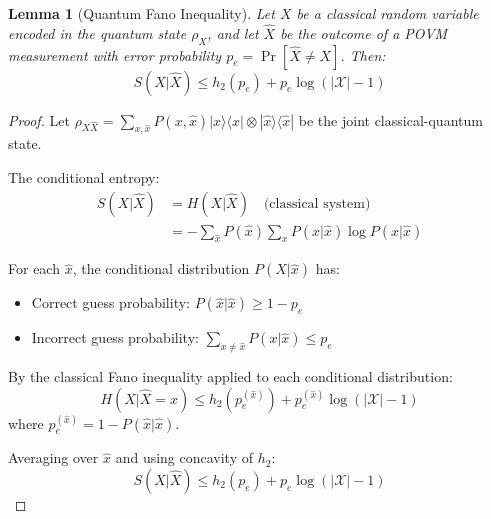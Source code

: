 \documentclass{ieeeaccess}
\newtheorem{lemma}{Lemma}[section]
\begin{document}
\begin{lemma}[Quantum Fano Inequality]\label{lem:quantum_fano}
Let $X$ be a classical random variable encoded in the quantum state $\rho_X$, and let $\hat{X}$ be the outcome of a POVM measurement with error probability $p_e = \Pr[\hat{X} \neq X]$. Then:
\begin{equation}
    S(X|\hat{X}) \leq h_2(p_e) + p_e \log(|\mathcal{X}| - 1)
\end{equation}
\end{lemma}

\begin{proof}
Let $\rho_{X\hat{X}} = \sum_{x,\hat{x}} P(x, \hat{x}) |x\rangle\langle x| \otimes |\hat{x}\rangle\langle\hat{x}|$ be the joint classical-quantum state.

The conditional entropy:
\begin{align}
    S(X|\hat{X}) &= H(X|\hat{X}) \quad \text{(classical system)} \\
    &= -\sum_{\hat{x}} P(\hat{x}) \sum_x P(x|\hat{x}) \log P(x|\hat{x})
\end{align}

For each $\hat{x}$, the conditional distribution $P(X|\hat{x})$ has:
\begin{itemize}
    \item Correct guess probability: $P(\hat{x}|\hat{x}) \geq 1 - p_e$
    \item Incorrect guess probability: $\sum_{x \neq \hat{x}} P(x|\hat{x}) \leq p_e$
\end{itemize}

By the classical Fano inequality applied to each conditional distribution:
\begin{equation}
    H(X|\hat{X} = \hat{x}) \leq h_2(p_e^{(\hat{x})}) + p_e^{(\hat{x})} \log(|\mathcal{X}| - 1)
\end{equation}
where $p_e^{(\hat{x})} = 1 - P(\hat{x}|\hat{x})$.

Averaging over $\hat{x}$ and using concavity of $h_2$:
\begin{equation}
    S(X|\hat{X}) \leq h_2(p_e) + p_e \log(|\mathcal{X}| - 1)
\end{equation}
\end{proof}
\end{document}
